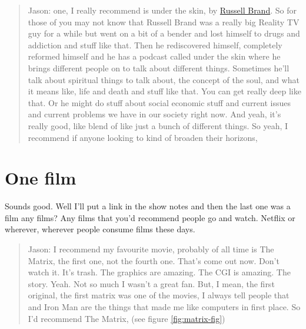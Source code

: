 \documentclass[
]{book}
\begin{document}
\begin{quote}
Jason: one, I really recommend is under the skin, by \href{https://en.wikipedia.org/wiki/Russell_Brand}{Russell Brand}. \citep{undertheskin} So for those of you may not know that Russell Brand was a really big Reality TV guy for a while but went on a bit of a bender and lost himself to drugs and addiction and stuff like that. Then he rediscovered himself, completely reformed himself and he has a podcast called under the skin where he brings different people on to talk about different things. Sometimes he'll talk about spiritual things to talk about, the concept of the soul, and what it means like, life and death and stuff like that. You can get really deep like that. Or he might do stuff about social economic stuff and current issues and current problems we have in our society right now. And yeah, it's really good, like blend of like just a bunch of different things. So yeah, I recommend if anyone looking to kind of broaden their horizons,
\end{quote}

\hypertarget{jfilm}{%
\section{One film}\label{jfilm}}

Sounds good. Well I'll put a link in the show notes and then the last one was a film any films? Any films that you'd recommend people go and watch. Netflix or wherever, wherever people consume films these days.

\begin{quote}
Jason: I recommend my favourite movie, probably of all time is The Matrix, the first one, \citep{thematrix} not the fourth one. That's come out now. Don't watch it. It's trash. The graphics are amazing. The CGI is amazing. The story. Yeah. Not so much I wasn't a great fan. But, I mean, the first original, the first matrix was one of the movies, I always tell people that and Iron Man \citep{ironman} are the things that made me like computers in first place. So I'd recommend The Matrix, (see figure \ref{fig:matrix-fig})
\end{quote}
\end{document}
